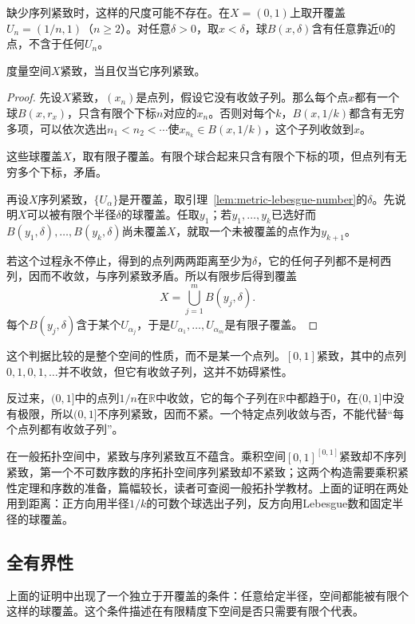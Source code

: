 缺少序列紧致时，这样的尺度可能不存在。在$X=(0,1)$上取开覆盖$U_n=(1/n,1)$（$n\geq2$）。对任意$\delta>0$，取$x<\delta$，球$B(x,\delta)$含有任意靠近$0$的点，不含于任何$U_n$。

\begin{theorem}[紧性的序列判据]
\label{thm:metric-compact-sequential}
度量空间$X$紧致，当且仅当它序列紧致。
\end{theorem}

\begin{proof}
先设$X$紧致，$(x_n)$是点列，假设它没有收敛子列。那么每个点$x$都有一个球$B(x,r_x)$，只含有限个下标$n$对应的$x_n$。否则对每个$k$，$B(x,1/k)$都含有无穷多项，可以依次选出$n_1<n_2<\cdots$使$x_{n_k}\in B(x,1/k)$，这个子列收敛到$x$。

这些球覆盖$X$，取有限子覆盖。有限个球合起来只含有限个下标的项，但点列有无穷多个下标，矛盾。

再设$X$序列紧致，$\{U_\alpha\}$是开覆盖，取引理~\ref{lem:metric-lebesgue-number}的$\delta$。先说明$X$可以被有限个半径$\delta$的球覆盖。任取$y_1$；若$y_1,\ldots,y_k$已选好而$B(y_1,\delta),\ldots,B(y_k,\delta)$尚未覆盖$X$，就取一个未被覆盖的点作为$y_{k+1}$。

若这个过程永不停止，得到的点列两两距离至少为$\delta$，它的任何子列都不是柯西列，因而不收敛，与序列紧致矛盾。所以有限步后得到覆盖
\[
X=\bigcup_{j=1}^mB(y_j,\delta).
\]
每个$B(y_j,\delta)$含于某个$U_{\alpha_j}$，于是$U_{\alpha_1},\ldots,U_{\alpha_m}$是有限子覆盖。
\end{proof}

这个判据比较的是整个空间的性质，而不是某一个点列。$[0,1]$紧致，其中的点列$0,1,0,1,\ldots$并不收敛，但它有收敛子列，这并不妨碍紧性。

反过来，$(0,1]$中的点列$1/n$在$\mathbb R$中收敛，它的每个子列在$\mathbb R$中都趋于$0$，在$(0,1]$中没有极限，所以$(0,1]$不序列紧致，因而不紧。一个特定点列收敛与否，不能代替“每个点列都有收敛子列”。

在一般拓扑空间中，紧致与序列紧致互不蕴含。乘积空间$[0,1]^{[0,1]}$紧致却不序列紧致，第一个不可数序数的序拓扑空间序列紧致却不紧致；这两个构造需要乘积紧性定理和序数的准备，篇幅较长，读者可查阅一般拓扑学教材。上面的证明在两处用到距离：正方向用半径$1/k$的可数个球选出子列，反方向用Lebesgue数和固定半径的球覆盖。

\subsection{全有界性}
\label{sec:metric-total-boundedness}

上面的证明中出现了一个独立于开覆盖的条件：任意给定半径，空间都能被有限个这样的球覆盖。这个条件描述在有限精度下空间是否只需要有限个代表。

